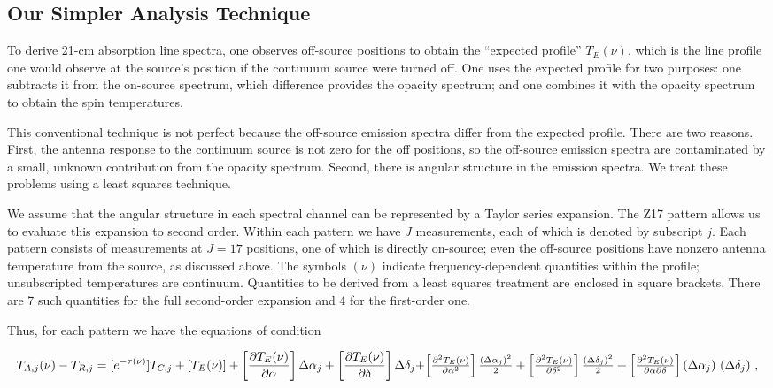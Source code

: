 \documentclass[12pt,preprint]{aastex}
\begin{document}
\subsection{ Our Simpler Analysis Technique}

To derive 21-cm absorption line spectra, one observes off-source
positions to obtain the ``expected profile'' $T_{E}(\nu )$, which is the
line profile one would observe at the source's position if the continuum
source were turned off. One uses the expected profile for two purposes:
one subtracts it from the on-source spectrum, which difference provides
the opacity spectrum; and one combines it with the opacity spectrum to
obtain the spin temperatures.

	This conventional technique is not perfect because the
off-source emission spectra differ from the expected profile. There are
two reasons. First, the antenna response to the continuum source is not
zero for the off positions, so the off-source emission spectra are
contaminated by a small, unknown contribution from the opacity spectrum.
Second, there is angular structure in the emission spectra. We treat these
problems using a least squares technique.

We assume that the angular structure in each spectral channel can be
represented by a Taylor series expansion. The Z17 pattern allows us to
evaluate this expansion to second order. Within each pattern we have $J$
measurements, each of which is denoted by subscript $j$. Each pattern
consists of measurements at $J=17$ positions, one of which is directly
on-source; even the off-source positions have nonzero
antenna temperature from the source, as discussed above.
The symbols $(\nu)$ indicate frequency-dependent quantities within the
profile; unsubscripted temperatures are continuum.  Quantities to be
derived from a least squares treatment are enclosed in square brackets.
There are 7 such quantities for the full second-order expansion and 4
for the first-order one.

Thus, for each pattern we have the equations of condition

\begin{equation} \label{ls1}
T_{A,j}(\nu) - T_{R,j} = [e^{-\tau (\nu)}] T_{C,j}  + [T_{E}(\nu)] +
\left[ \partial T_{E}(\nu) \over \partial \alpha \right] \Delta\alpha_{j} + 
\left[ \partial T_{E}(\nu) \over \partial \delta \right] \Delta\delta_{j} + $$
$$
\left[ \partial^2 T_{E}(\nu) \over \partial \alpha^2 \right]
     {(\Delta\alpha_{j})^2 \over 2} + 
\left[ \partial^2 T_{E}(\nu) \over \partial \delta^2 \right]
     {(\Delta\delta_{j})^2 \over 2} + 
\left[ \partial^2 T_{E}(\nu) \over \partial\alpha \partial\delta \right]
     (\Delta\alpha_{j}) \ (\Delta\delta_{j}) \ ,
\end{equation}
\end{document}
